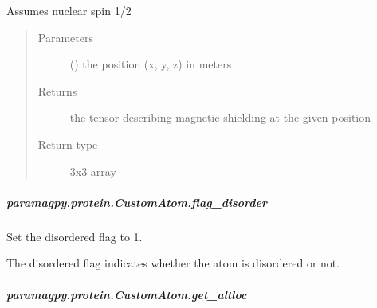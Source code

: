 \documentclass[a4paper,10pt,english,openany,oneside]{sphinxmanual}
\begin{document}
\begin{fulllineitems}
\begin{fulllineitems}
\begin{fulllineitems}
\sphinxAtStartPar
Assumes nuclear spin 1/2
\begin{quote}\begin{description}
\item[{Parameters}] \leavevmode
\sphinxAtStartPar
{} () \textendash{} the position (x, y, z) in meters

\item[{Returns}] \leavevmode
\sphinxAtStartPar
{} \textendash{} the tensor describing magnetic shielding at the given position

\item[{Return type}] \leavevmode
\sphinxAtStartPar
3x3 array

\end{description}\end{quote}

\end{fulllineitems}



\subparagraph{paramagpy.protein.CustomAtom.flag\_disorder}
\label{\detokenize{reference/generated/paramagpy.protein.CustomAtom.flag_disorder:paramagpy-protein-customatom-flag-disorder}}\label{\detokenize{reference/generated/paramagpy.protein.CustomAtom.flag_disorder::doc}}

\begin{fulllineitems}
\label{\detokenize{reference/generated/paramagpy.protein.CustomAtom.flag_disorder:paramagpy.protein.CustomAtom.flag_disorder}}
\sphinxAtStartPar
Set the disordered flag to 1.

\sphinxAtStartPar
The disordered flag indicates whether the atom is disordered or not.

\end{fulllineitems}



\subparagraph{paramagpy.protein.CustomAtom.get\_altloc}
\label{\detokenize{reference/generated/paramagpy.protein.CustomAtom.get_altloc:paramagpy-protein-customatom-get-altloc}}\label{\detokenize{reference/generated/paramagpy.protein.CustomAtom.get_altloc::doc}}


\end{fulllineitems}
\end{fulllineitems}
\end{document}
